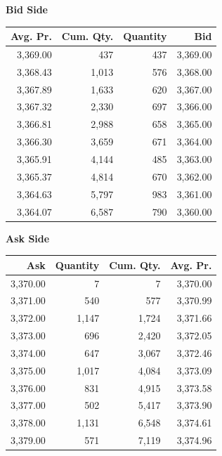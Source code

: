 \noindent \begin{minipage}[t]{0.48\textwidth} \centering \begingroup\color{\englishbodycolorname} \textbf{Bid Side}

\smallskip \begin{tabular}{@{} rrrr@{}}
\toprule
Avg. Pr. & Cum. Qty. & Quantity & Bid \\
\midrule
3,369.00 & 437 & 437 & 3,369.00 \\
3,368.43 & 1,013 & 576 & 3,368.00 \\
3,367.89 & 1,633 & 620 & 3,367.00 \\
3,367.32 & 2,330 & 697 & 3,366.00 \\
3,366.81 & 2,988 & 658 & 3,365.00 \\
3,366.30 & 3,659 & 671 & 3,364.00 \\
3,365.91 & 4,144 & 485 & 3,363.00 \\
3,365.37 & 4,814 & 670 & 3,362.00 \\
3,364.63 & 5,797 & 983 & 3,361.00 \\
3,364.07 & 6,587 & 790 & 3,360.00 \\
\bottomrule
\end{tabular}
\endgroup \end{minipage}\hfill \begin{minipage}[t]{0.48\textwidth} \centering \begingroup\color{\englishbodycolorname} \textbf{Ask Side}

\smallskip \begin{tabular}{@{} rrrr@{}}
\toprule
Ask & Quantity & Cum. Qty. & Avg. Pr. \\
\midrule
3,370.00 & 7 & 7 & 3,370.00 \\
3,371.00 & 540 & 577 & 3,370.99 \\
3,372.00 & 1,147 & 1,724 & 3,371.66 \\
3,373.00 & 696 & 2,420 & 3,372.05 \\
3,374.00 & 647 & 3,067 & 3,372.46 \\
3,375.00 & 1,017 & 4,084 & 3,373.09 \\
3,376.00 & 831 & 4,915 & 3,373.58 \\
3,377.00 & 502 & 5,417 & 3,373.90 \\
3,378.00 & 1,131 & 6,548 & 3,374.61 \\
3,379.00 & 571 & 7,119 & 3,374.96 \\
\bottomrule
\end{tabular}
\endgroup \end{minipage}
\endgroup


